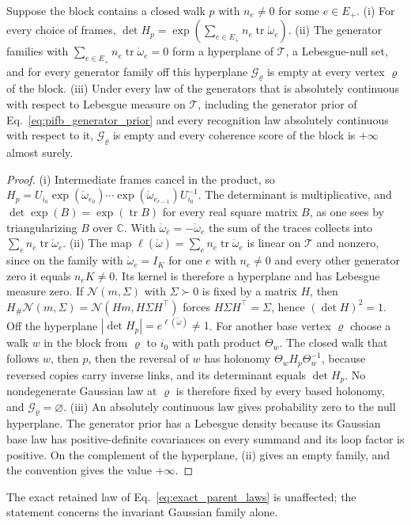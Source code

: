 \begin{proposition}\label{prop:sp_holonomy_gaussian}
Suppose the block contains a closed walk $p$ with $n_e\neq0$ for some $e\in E_+$.
(i) For every choice of frames, $\det H_p=\exp(\sum_{e\in E_+}n_e\operatorname{tr}\mathring\omega_e)$.
(ii) The generator families with $\sum_{e\in E_+}n_e\operatorname{tr}\mathring\omega_e=0$ form a hyperplane of $\mathcal T$, a Lebesgue-null set, and for every generator family off this hyperplane $\mathcal G_\varrho$ is empty at every vertex $\varrho$ of the block.
(iii) Under every law of the generators that is absolutely continuous with respect to Lebesgue measure on $\mathcal T$, including the generator prior of Eq.~\eqref{eq:pifb_generator_prior} and every recognition law absolutely continuous with respect to it, $\mathcal G_\varrho$ is empty and every coherence score of the block is $+\infty$ almost surely.
\end{proposition}
\begin{proof}
(i) Intermediate frames cancel in the product, so $H_p=U_{i_0}\exp(\mathring\omega_{e_0})\cdots\exp(\mathring\omega_{e_{r-1}})U_{i_0}^{-1}$. The determinant is multiplicative, and $\det\exp(B)=\exp(\operatorname{tr}B)$ for every real square matrix $B$, as one sees by triangularizing $B$ over $\mathbb C$. With $\mathring\omega_{\bar e}=-\mathring\omega_e$ the sum of the traces collects into $\sum_en_e\operatorname{tr}\mathring\omega_e$.
(ii) The map $\ell(\mathring\omega)=\sum_en_e\operatorname{tr}\mathring\omega_e$ is linear on $\mathcal T$ and nonzero, since on the family with $\mathring\omega_e=I_K$ for one $e$ with $n_e\neq0$ and every other generator zero it equals $n_eK\neq0$. Its kernel is therefore a hyperplane and has Lebesgue measure zero. If $\mathcal N(m,\Sigma)$ with $\Sigma\succ0$ is fixed by a matrix $H$, then $H_\#\mathcal N(m,\Sigma)=\mathcal N(Hm,H\Sigma H^\top)$ forces $H\Sigma H^\top=\Sigma$, hence $(\det H)^2=1$. Off the hyperplane $|\det H_p|=e^{\ell(\mathring\omega)}\neq1$. For another base vertex $\varrho$ choose a walk $w$ in the block from $\varrho$ to $i_0$ with path product $\Theta_w$. The closed walk that follows $w$, then $p$, then the reversal of $w$ has holonomy $\Theta_wH_p\Theta_w^{-1}$, because reversed copies carry inverse links, and its determinant equals $\det H_p$. No nondegenerate Gaussian law at $\varrho$ is therefore fixed by every based holonomy, and $\mathcal G_\varrho=\varnothing$.
(iii) An absolutely continuous law gives probability zero to the null hyperplane. The generator prior has a Lebesgue density because its Gaussian base law has positive-definite covariances on every summand and its loop factor is positive. On the complement of the hyperplane, (ii) gives an empty family, and the convention gives the value $+\infty$.
\end{proof}
The exact retained law of Eq.~\eqref{eq:exact_parent_laws} is unaffected; the statement concerns the invariant Gaussian family alone.

